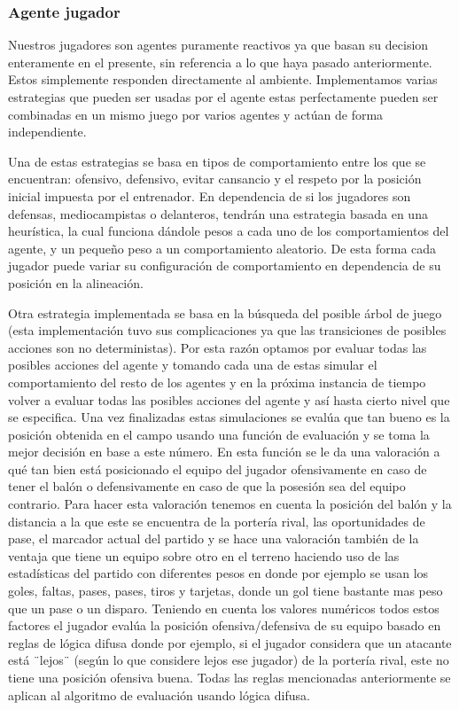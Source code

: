 \documentclass{article}
\begin{document}
\subsubsection{Agente jugador}
Nuestros jugadores son agentes puramente reactivos ya que basan su decision enteramente en el presente, sin referencia 
a lo que haya pasado anteriormente. Estos simplemente responden directamente al ambiente. Implementamos varias 
estrategias que pueden ser usadas por el agente estas perfectamente pueden ser combinadas en un mismo juego por 
varios agentes y actúan de forma independiente.

Una de estas estrategias se basa en tipos de comportamiento entre los que se encuentran: ofensivo, defensivo, evitar 
cansancio y el respeto por la posición inicial impuesta por el entrenador. En dependencia de si los jugadores son 
defensas, mediocampistas o delanteros, tendrán una estrategia basada en una heurística, la cual funciona dándole 
pesos a cada uno de los comportamientos del agente, y un pequeño peso a un comportamiento aleatorio. De esta forma 
cada jugador puede variar su configuración de comportamiento en dependencia de su posición en la alineación.

Otra estrategia implementada se basa en la búsqueda del posible árbol de juego (esta implementación tuvo sus complicaciones 
ya que las transiciones de posibles acciones son no deterministas). Por esta razón 
optamos por evaluar todas las posibles acciones del agente y tomando cada una de estas simular el comportamiento del 
resto de los agentes y en la próxima instancia de tiempo volver a evaluar todas las posibles acciones del agente y así 
hasta cierto nivel que se especifica. Una vez finalizadas estas simulaciones se evalúa que tan bueno es la posición 
obtenida en el campo usando una función de evaluación y se toma la mejor decisión en base a este número. En esta 
función se le da una valoración a qué tan bien está posicionado el equipo del jugador ofensivamente en caso de tener 
el balón o defensivamente en caso de que la posesión sea del equipo contrario. Para hacer esta valoración tenemos en 
cuenta la posición del balón y la distancia a la que este se encuentra de la portería rival, las oportunidades de 
pase, el marcador actual del partido y se hace una valoración también de la ventaja que tiene un equipo sobre otro 
en el terreno haciendo uso de las estadísticas del partido con diferentes pesos en donde por ejemplo se usan los 
goles, faltas, pases, pases, tiros y tarjetas, donde un gol tiene bastante mas peso que un pase  o un disparo. 
Teniendo en cuenta los valores numéricos todos estos factores el jugador evalúa la posición ofensiva/defensiva de 
su equipo basado en reglas de lógica difusa donde por ejemplo, si el jugador considera que un atacante está ¨lejos¨ 
(según lo que considere lejos ese jugador) de la portería rival, este no tiene una posición ofensiva buena.
Todas las reglas mencionadas anteriormente se aplican al algoritmo de evaluación usando lógica difusa.
\end{document}
